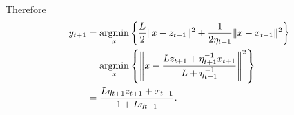 \documentclass[12pt]{article}
\begin{document}
\begin{remark}
{\begin{align*}
                \end{align*}
                }
                Therefore 
                \begin{align*}
                    y_{t + 1} &= \mathop{\rm argmin}\limits_{x}\left\lbrace
                        \frac{L}{2}\Vert x - z_{t + 1}\Vert^2 + 
                        \frac{1}{2\eta_{t + 1}}\Vert x - x_{t + 1}\Vert^2
                    \right\rbrace
                    \\
                    &= \mathop{\rm argmin}\limits_{x}\left\lbrace
                        \left\Vert x - 
                            \frac{Lz_{t + 1} + \eta_{t + 1}^{-1}x_{t + 1}}{
                                L + \eta_{t + 1}^{-1}
                            }
                        \right\Vert^2
                    \right\rbrace
                    \\
                    &= 
                    \frac{
                        L\eta_{t + 1}z_{t + 1} + 
                        x_{t + 1}
                    }{
                        1 + L \eta_{t + 1}
                    }. 
                \end{align*}
            \end{remark}
\end{document}

